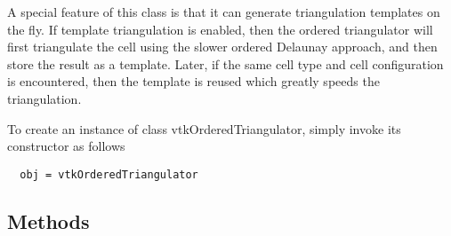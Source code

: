  A special feature of this class is that it can generate triangulation 
 templates on the fly. If template triangulation is enabled, then the
 ordered triangulator will first triangulate the cell using the slower
 ordered Delaunay approach, and then store the result as a template.
 Later, if the same cell type and cell configuration is encountered,
 then the template is reused which greatly speeds the triangulation.

To create an instance of class vtkOrderedTriangulator, simply
invoke its constructor as follows
\begin{verbatim}
  obj = vtkOrderedTriangulator
\end{verbatim}
\subsection{Methods}

